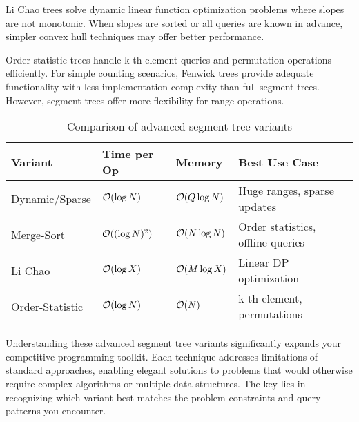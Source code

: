 Li Chao trees solve dynamic linear function optimization problems where slopes are not monotonic. When slopes are sorted or all queries are known in advance, simpler convex hull techniques may offer better performance.

Order-statistic trees handle k-th element queries and permutation operations efficiently. For simple counting scenarios, Fenwick trees provide adequate functionality with less implementation complexity than full segment trees. However, segment trees offer more flexibility for range operations.

\begin{table}
\footnotesize
\begin{tabular}{@{}llll@{}}
\toprule
\textbf{Variant} & \textbf{Time per Op} & \textbf{Memory} & \textbf{Best Use Case} \\
\midrule
Dynamic/Sparse & $\mathcal{O}(\log N)$ & $\mathcal{O}(Q \log N)$ & Huge ranges, sparse updates \\
Merge-Sort & $\mathcal{O}((\log N)^2)$ & $\mathcal{O}(N \log N)$ & Order statistics, offline queries \\
Li Chao & $\mathcal{O}(\log X)$ & $\mathcal{O}(M \log X)$ & Linear DP optimization \\
Order-Statistic & $\mathcal{O}(\log N)$ & $\mathcal{O}(N)$ & k-th element, permutations \\
\bottomrule
\end{tabular}
\caption{Comparison of advanced segment tree variants}
\end{table}


Understanding these advanced segment tree variants significantly expands your competitive programming toolkit. Each technique addresses limitations of standard approaches, enabling elegant solutions to problems that would otherwise require complex algorithms or multiple data structures. The key lies in recognizing which variant best matches the problem constraints and query patterns you encounter.